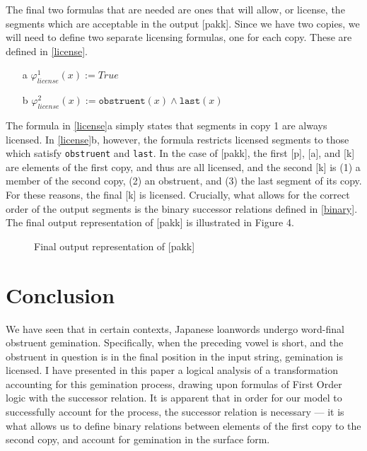 \documentclass{article}
\begin{document}
The final two formulas that are needed are ones that will allow, or license, the segments which are acceptable in the output [pakk]. Since we have two copies, we will need to define two separate licensing formulas, one for each copy. These are defined in \ref{license}.

\begin{exe}
    \ex
    \label{license}
    \begin{itemize}
        \item [a] $\varphi_{license}^{1}(x) := True$
        \item [b] $\varphi_{license}^{2}(x) := \texttt{obstruent}(x) \wedge \texttt{last}(x)$
    \end{itemize}
\end{exe}

The formula in \ref{license}a simply states that segments in copy 1 are always licensed. In \ref{license}b, however, the formula restricts licensed segments to those which satisfy \texttt{obstruent} and \texttt{last}. In the case of [pakk], the first [p], [a], and [k] are elements of the first copy, and thus are all licensed, and the second [k] is (1) a member of the second copy, (2) an obstruent, and (3) the last segment of its copy. For these reasons, the final [k] is licensed. Crucially, what allows for the correct order of the output segments is the binary successor relations defined in \ref{binary}. The final output representation of [pakk] is illustrated in Figure 4.

\begin{figure}[ht]
    \centering
    \caption{Final output representation of [pakk]}
\end{figure}

\section{Conclusion}
We have seen that in certain contexts, Japanese loanwords undergo word-final obstruent gemination. Specifically, when the preceding vowel is short, and the obstruent in question is in the final position in the input string, gemination is licensed. I have presented in this paper a logical analysis of a transformation accounting for this gemination process, drawing upon formulas of First Order logic with the successor relation. It is apparent that in order for our model to successfully account for the process, the successor relation is necessary — it is what allows us to define binary relations between elements of the first copy to the second copy, and account for gemination in the surface form.

\printbibliography
\end{document}
